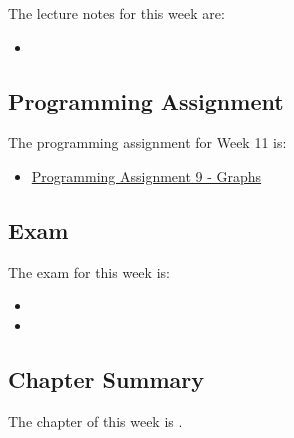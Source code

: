 \noindent The lecture notes for this week are:

\begin{itemize}
    \item {}
\end{itemize}

\subsection{Programming Assignment}

The programming assignment for Week 11 is:

\begin{itemize}
    \item \href{https://github.com/QuantumCompiler/CU/tree/main/CSPB%202270%20-%20Data%20Structures/CSPB%202270%20-%20Programming%20Assignments/CSPB%202270%20-%20Assignment%209%20-%20Graphs}{Programming Assignment 9 - Graphs}
\end{itemize}

\subsection{Exam}

The exam for this week is:

\begin{itemize}
    \item {}
    \item {}
\end{itemize}

\subsection{Chapter Summary}

The chapter of this week is .

